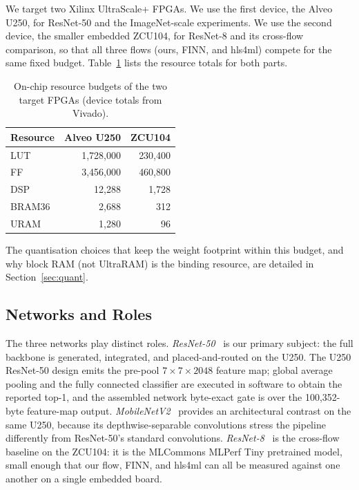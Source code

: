 \documentclass[acmtog,authorversion]{acmart}
\begin{document}
We target two Xilinx UltraScale+ FPGAs. We use the first device, the Alveo U250, for ResNet-50 and the ImageNet-scale experiments. We use the second device, the smaller embedded ZCU104, for ResNet-8 and its cross-flow comparison, so that all three flows (ours, FINN, and hls4ml) compete for the same fixed budget. Table~\ref{tab:devices} lists the resource totals for both parts.

\begin{table}[t]
\centering
\caption{On-chip resource budgets of the two target FPGAs (device totals from Vivado).}
\label{tab:devices}
\begin{tabular}{lrr}
\toprule
Resource & Alveo U250 & ZCU104 \\
\midrule
LUT     & 1,728,000 & 230,400 \\
FF      & 3,456,000 & 460,800 \\
DSP     & 12,288    & 1,728   \\
BRAM36  & 2,688     & 312     \\
URAM    & 1,280     & 96      \\
\bottomrule
\end{tabular}
\end{table}

The quantisation choices that keep the weight footprint within this budget, and why block RAM (not UltraRAM) is the binding resource, are detailed in Section~\ref{sec:quant}.

\subsection{Networks and Roles}

The three networks play distinct roles. \emph{ResNet-50}~\cite{he2016} is our primary subject: the full backbone is generated, integrated, and placed-and-routed on the U250. The U250 ResNet-50 design emits the pre-pool $7\times7\times2048$ feature map; global average pooling and the fully connected classifier are executed in software to obtain the reported top-1, and the assembled network byte-exact gate is over the 100,352-byte feature-map output. \emph{MobileNetV2}~\cite{sandler2018} provides an architectural contrast on the same U250, because its depthwise-separable convolutions stress the pipeline differently from ResNet-50's standard convolutions. \emph{ResNet-8}~\cite{banbury2021} is the cross-flow baseline on the ZCU104: it is the MLCommons MLPerf Tiny pretrained model, small enough that our flow, FINN, and hls4ml can all be measured against one another on a single embedded board.
\end{document}
